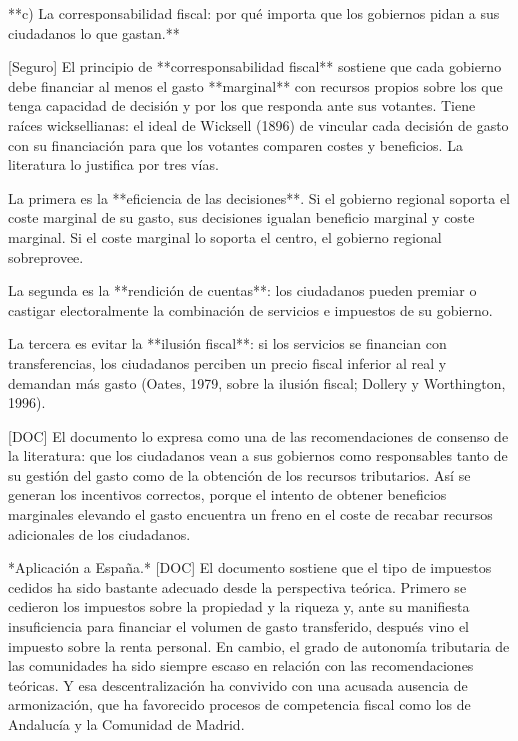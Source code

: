 \documentclass[10pt,a4paper]{article}
\begin{document}
**c) La corresponsabilidad fiscal: por qué importa que los gobiernos pidan a sus ciudadanos lo que gastan.**

[Seguro] El principio de **corresponsabilidad fiscal** sostiene que cada gobierno debe financiar al menos el gasto **marginal** con recursos propios sobre los que tenga capacidad de decisión y por los que responda ante sus votantes. Tiene raíces wicksellianas: el ideal de Wicksell (1896) de vincular cada decisión de gasto con su financiación para que los votantes comparen costes y beneficios. La literatura lo justifica por tres vías.

La primera es la **eficiencia de las decisiones**. Si el gobierno regional soporta el coste marginal de su gasto, sus decisiones igualan beneficio marginal y coste marginal. Si el coste marginal lo soporta el centro, el gobierno regional sobreprovee.

La segunda es la **rendición de cuentas**: los ciudadanos pueden premiar o castigar electoralmente la combinación de servicios e impuestos de su gobierno.

La tercera es evitar la **ilusión fiscal**: si los servicios se financian con transferencias, los ciudadanos perciben un precio fiscal inferior al real y demandan más gasto (Oates, 1979, sobre la ilusión fiscal; Dollery y Worthington, 1996).

[DOC] El documento lo expresa como una de las recomendaciones de consenso de la literatura: que los ciudadanos vean a sus gobiernos como responsables tanto de su gestión del gasto como de la obtención de los recursos tributarios. Así se generan los incentivos correctos, porque el intento de obtener beneficios marginales elevando el gasto encuentra un freno en el coste de recabar recursos adicionales de los ciudadanos.

*Aplicación a España.* [DOC] El documento sostiene que el tipo de impuestos cedidos ha sido bastante adecuado desde la perspectiva teórica. Primero se cedieron los impuestos sobre la propiedad y la riqueza y, ante su manifiesta insuficiencia para financiar el volumen de gasto transferido, después vino el impuesto sobre la renta personal. En cambio, el grado de autonomía tributaria de las comunidades ha sido siempre escaso en relación con las recomendaciones teóricas. Y esa descentralización ha convivido con una acusada ausencia de armonización, que ha favorecido procesos de competencia fiscal como los de Andalucía y la Comunidad de Madrid.
\end{document}
